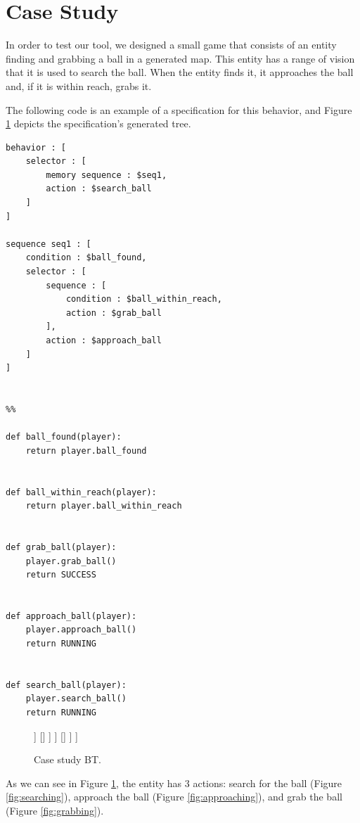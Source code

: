 \documentclass[a4paper,UKenglish,cleveref, autoref, thm-restate]{oasics-v2019}
\begin{document}
\section{Case Study}
In order to test our tool, we designed a small game that consists of an entity finding and grabbing a ball in a generated map.
This entity has a range of vision that it is used to search the ball.
When the entity finds it, it approaches the ball and, if it is within reach, grabs it.

The following code is an example of a specification for this behavior, and Figure \ref{fig:case_study_bt} depicts the specification's generated tree.
\begin{lstlisting}
behavior : [
    selector : [
        memory sequence : $seq1,
        action : $search_ball
    ]
]

sequence seq1 : [
    condition : $ball_found,
    selector : [
        sequence : [
            condition : $ball_within_reach,
            action : $grab_ball
        ],
        action : $approach_ball
    ]
]


%%

def ball_found(player):
    return player.ball_found


def ball_within_reach(player):
    return player.ball_within_reach


def grab_ball(player):
    player.grab_ball()
    return SUCCESS


def approach_ball(player):
    player.approach_ball()
    return RUNNING


def search_ball(player):
    player.search_ball()
    return RUNNING
\end{lstlisting}

\begin{figure}
    \centering
    \begin{behavior}
        [\rootnode
            [\selector
                [\memorysequence
                    [\condition{ball found}]
                    [\selector
                        [\sequence
                            [\condition{ball within reach}]
                            [\action{grab ball}]
                        ]
                        []
                    ]
                ]
                []
            ]
        ]
    \end{behavior}
    \caption{Case study BT.}
    \label{fig:case_study_bt}
\end{figure}

As we can see in Figure \ref{fig:case_study_bt}, the entity has 3 actions: search for the ball (Figure \ref{fig:searching}), approach the ball (Figure \ref{fig:approaching}), and grab the ball (Figure \ref{fig:grabbing}).
\end{document}
